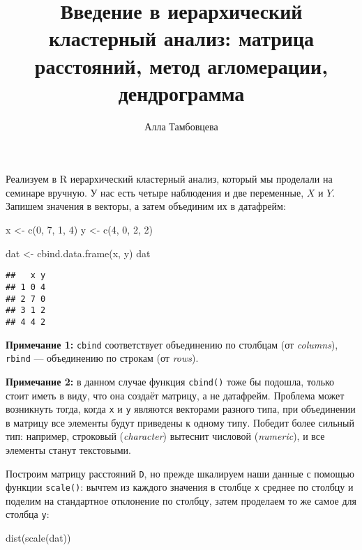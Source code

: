 \documentclass[
]{article}
\title{Введение в иерархический кластерный анализ: матрица расстояний,
метод агломерации, дендрограмма}
\author{Алла Тамбовцева}
\date{}
\newenvironment{Shaded}{\begin{snugshade}}{\end{snugshade}}
\newcommand{\DecValTok}[1]{\textcolor[rgb]{0.00,0.00,0.81}{#1}}
\newcommand{\FunctionTok}[1]{\textcolor[rgb]{0.00,0.00,0.00}{#1}}
\newcommand{\NormalTok}[1]{#1}
\newcommand{\OtherTok}[1]{\textcolor[rgb]{0.56,0.35,0.01}{#1}}
\begin{document}
\maketitle

\large

Реализуем в R иерархический кластерный анализ, который мы проделали на
семинаре вручную. У нас есть четыре наблюдения и две переменные, \(X\) и
\(Y\). Запишем значения в векторы, а затем объединим их в датафрейм:

\begin{Shaded}
\begin{Highlighting}[]
\NormalTok{x }\OtherTok{\textless{}{-}} \FunctionTok{c}\NormalTok{(}\DecValTok{0}\NormalTok{, }\DecValTok{7}\NormalTok{, }\DecValTok{1}\NormalTok{, }\DecValTok{4}\NormalTok{)}
\NormalTok{y }\OtherTok{\textless{}{-}} \FunctionTok{c}\NormalTok{(}\DecValTok{4}\NormalTok{, }\DecValTok{0}\NormalTok{, }\DecValTok{2}\NormalTok{, }\DecValTok{2}\NormalTok{)}

\NormalTok{dat }\OtherTok{\textless{}{-}} \FunctionTok{cbind.data.frame}\NormalTok{(x, y)}
\NormalTok{dat}
\end{Highlighting}
\end{Shaded}

\begin{verbatim}
##   x y
## 1 0 4
## 2 7 0
## 3 1 2
## 4 4 2
\end{verbatim}

\textbf{Примечание 1:} \texttt{cbind} соответствует объединению по
столбцам (от \emph{columns}), \texttt{rbind} --- объединению по строкам
(от \emph{rows}).

\textbf{Примечание 2:} в данном случае функция \texttt{cbind()} тоже бы
подошла, только стоит иметь в виду, что она создаёт матрицу, а не
датафрейм. Проблема может возникнуть тогда, когда \texttt{x} и
\texttt{y} являются векторами разного типа, при объединении в матрицу
все элементы будут приведены к одному типу. Победит более сильный тип:
например, строковый (\emph{character}) вытеснит числовой
(\emph{numeric}), и все элементы станут текстовыми.

Построим матрицу расстояний \texttt{D}, но прежде шкалируем наши данные
с помощью функции \texttt{scale()}: вычтем из каждого значения в столбце
\texttt{x} среднее по столбцу и поделим на стандартное отклонение по
столбцу, затем проделаем то же самое для столбца \texttt{y}:

\begin{Shaded}
\begin{Highlighting}[]
\FunctionTok{dist}\NormalTok{(}\FunctionTok{scale}\NormalTok{(dat))}
\end{Highlighting}
\end{Shaded}
\end{document}
